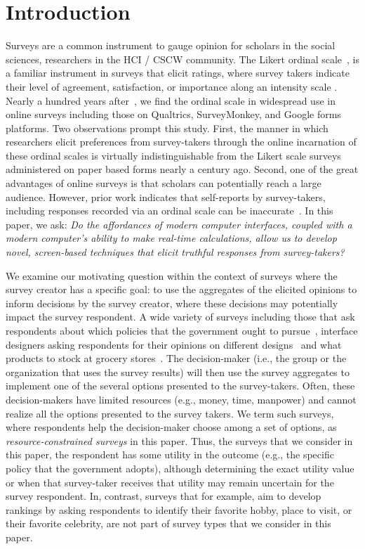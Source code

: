 \section{Introduction}

Surveys are a common instrument to gauge opinion for scholars in the social sciences, researchers in the HCI / CSCW community. The Likert ordinal scale~\cite{likert1932technique}, is a familiar instrument in surveys that elicit ratings, where survey takers indicate their level of agreement, satisfaction, or importance along an intensity scale \cite{moors2016two}. Nearly a hundred years after~\textcite{likert1932technique}, we find the ordinal scale in widespread use in online surveys including those on Qualtrics, SurveyMonkey, and Google forms platforms. Two observations prompt this study. First, the manner in which researchers elicit preferences from survey-takers through the online incarnation of these ordinal scales is virtually indistinguishable from the Likert scale surveys administered on paper based forms nearly a century ago. Second, one of the great advantages of online surveys is that scholars can potentially reach a large audience. However, prior work indicates that self-reports by survey-takers, including responses recorded via an ordinal scale can be inaccurate~\cite{araujo2017much, vavreck2007exaggerated}. In this paper, we ask: \textit{Do the affordances of modern computer interfaces, coupled with a modern computer's ability to make real-time calculations, allow us to develop novel, screen-based techniques that elicit truthful responses from survey-takers?}

We examine our motivating question within the context of surveys where the survey creator has a specific goal: to use the aggregates of the elicited opinions to inform decisions by the survey creator, where these decisions may potentially impact the survey respondent. A wide variety of surveys including those that ask respondents about which policies that the government ought to pursue~\cite{pew_spending}, interface  designers asking respondents for their opinions on different designs~\cite{ledo2018evaluation} and what products to stock at grocery stores~\cite{nielsen}. The decision-maker (i.e., the group or the organization that uses the survey results) will then use the survey aggregates to implement one of the several options presented to the survey-takers. Often, these decision-makers have limited resources (e.g., money, time, manpower) and cannot realize all the options presented to the survey takers. We term such surveys, where respondents help the decision-maker choose among a set of options, as \textit{resource-constrained surveys} in this paper.   Thus, the surveys that we consider in this paper, the respondent has some utility in the outcome (e.g., the specific policy that the government adopts), although determining the exact utility value or when that survey-taker receives that utility may remain uncertain for the survey respondent. In, contrast, surveys that for example, aim to develop rankings by asking respondents to identify their favorite hobby, place to visit, or their favorite celebrity, are not part of survey types that we consider in this paper. 

